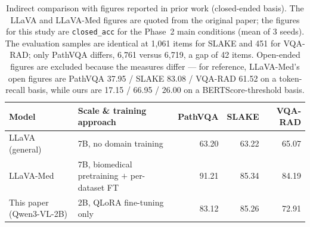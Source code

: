 \begin{table}[h]
\centering
\caption{Indirect comparison with figures reported in prior work (closed-ended
basis). The LLaVA and LLaVA-Med figures are quoted from the original paper; the
figures for this study are \texttt{closed\_acc} for the Phase~2 main conditions
(mean of 3 seeds). The evaluation samples are identical at 1,061 items for SLAKE
and 451 for VQA-RAD; only PathVQA differs, 6,761 versus 6,719, a gap of 42 items.
Open-ended figures are excluded because the measures differ --- for reference,
LLaVA-Med's open figures are PathVQA 37.95 / SLAKE 83.08 / VQA-RAD 61.52 on a
token-recall basis, while ours are 17.15 / 66.95 / 26.00 on a
BERTScore-threshold basis.}
\label{tab:appllavamed}
\small
\begin{tabular}{@{}llrrr@{}}
\toprule
Model & Scale \& training approach & PathVQA & SLAKE & VQA-RAD \\
\midrule
LLaVA (general) \citep{liu2023llava} & 7B, no domain training & 63.20 & 63.22 & 65.07 \\
LLaVA-Med \citep{li2023llavamed} & 7B, biomedical pretraining $+$ per-dataset FT & 91.21 & 85.34 & 84.19 \\
This paper (Qwen3-VL-2B) & 2B, QLoRA fine-tuning only & 83.12 & 85.26 & 72.91 \\
\bottomrule
\end{tabular}
\end{table}
